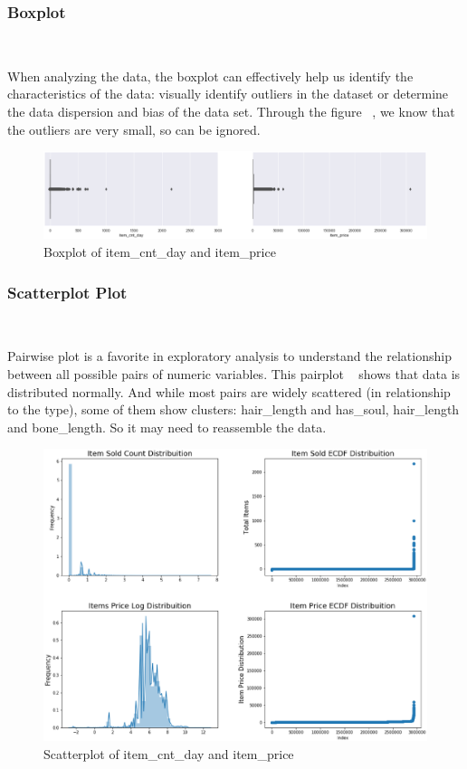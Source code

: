 \subsubsection{Boxplot}
\
 
When analyzing the data, 
the boxplot can effectively 
help us identify the characteristics of the data:
visually identify outliers in the dataset or
determine the data dispersion and 
bias of the data set. 
Through the figure ~, 
we know that the outliers are very small,
so can be ignored.


\begin{figure}[htbp]
	\centering
	\includegraphics[scale=0.3]{figures/boxplot.eps}
	\caption{Boxplot of item_cnt_day and item_price}\label{fig:boxplot}
\end{figure}


\subsubsection{Scatterplot Plot} 
\

Pairwise plot is 
a favorite in exploratory analysis 
to understand the relationship 
between all possible pairs 
of numeric variables. 
This pairplot ~ 
shows that data is distributed normally. 
And while most pairs are widely scattered 
(in relationship to the type), 
some of them show clusters: 
hair\_length and has\_soul, 
hair\_length and bone\_length. 
So it may need to reassemble the data.

\begin{figure}[htbp]
	\centering
	\includegraphics[scale=0.4]{figures/scatterplot.eps}
	\caption{Scatterplot of item_cnt_day and item_price}\label{fig:scatterplot}
\end{figure}

